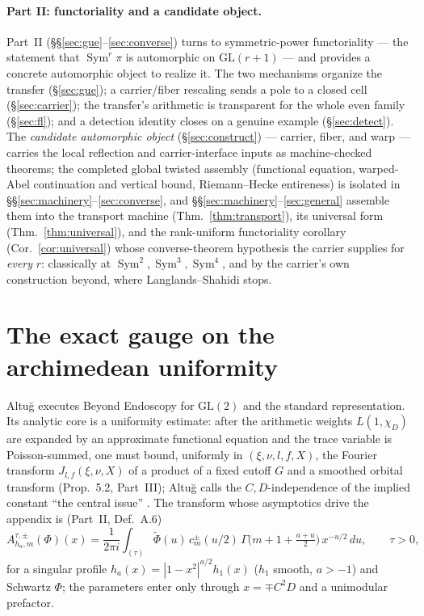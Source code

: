 \documentclass[11pt]{article}
\theoremstyle{definition}
\newcommand{\wt}[1]{\widetilde{#1}}
\newcommand{\Sym}{\operatorname{Sym}}
\begin{document}
\paragraph{Part II: functoriality and a candidate object.} Part~II
(\S\S\ref{sec:gue}--\ref{sec:converse}) turns to symmetric-power functoriality --- the statement that
$\Sym^r\pi$ is automorphic on $\mathrm{GL}(r+1)$ --- and provides a concrete automorphic object to
realize it. The two mechanisms organize the transfer (\S\ref{sec:gue}); a carrier/fiber rescaling
sends a pole to a closed cell (\S\ref{sec:carrier}); the transfer's arithmetic is transparent for the
whole even family (\S\ref{sec:fl}); and a detection identity closes on a genuine example
(\S\ref{sec:detect}). The \emph{candidate automorphic object} (\S\ref{sec:construct}) --- carrier,
fiber, and warp --- carries the local reflection and carrier-interface inputs as machine-checked theorems;
the completed global twisted assembly (functional equation, warped-Abel continuation and vertical bound,
Riemann--Hecke entireness) is isolated in \S\S\ref{sec:machinery}--\ref{sec:converse}, and
\S\S\ref{sec:machinery}--\ref{sec:general} assemble them into the transport machine (Thm.~\ref{thm:transport}),
its universal form (Thm.~\ref{thm:universal}), and the rank-uniform functoriality corollary
(Cor.~\ref{cor:universal}) whose converse-theorem hypothesis the carrier supplies for \emph{every} $r$:
classically at $\Sym^2,\Sym^3,\Sym^4$, and by the carrier's own construction beyond, where Langlands--Shahidi
stops.

\section{The exact gauge on the archimedean uniformity}\label{sec:gauge}

Altu\u{g} \cite{AltI,AltII,AltIII} executes Beyond Endoscopy for $\mathrm{GL}(2)$ and the standard
representation. Its analytic core is a uniformity estimate: after the arithmetic weights $L(1,\chi_D)$
are expanded by an approximate functional equation and the trace variable is Poisson-summed, one must
bound, uniformly in $(\xi,\nu,l,f,X)$, the Fourier transform $J_{l,f}(\xi,\nu,X)$ of a product of a
fixed cutoff $G$ and a smoothed orbital transform (Prop.~5.2, Part~III); Altu\u{g} calls the
$C,D$-independence of the implied constant ``the central issue'' \cite[App.~A]{AltII}. The transform
whose asymptotics drive the appendix is (Part~II, Def.~A.6)
\begin{equation}\label{eq:A6}
  A^{\tau,\pm}_{h_a,m}(\Phi)(x)=\frac{1}{2\pi i}\int_{(\tau)}\wt\Phi(u)\,c^{\pm}_m(u/2)\,
    \Gamma\!\Big(m+1+\tfrac{a+u}{2}\Big)\,x^{-u/2}\,du,\qquad \tau>0,
\end{equation}
for a singular profile $h_a(x)=|1-x^2|^{a/2}h_1(x)$ ($h_1$ smooth, $a>-1$) and Schwartz $\Phi$; the
parameters enter only through $x=\mp C^2D$ and a unimodular prefactor.
\end{document}
